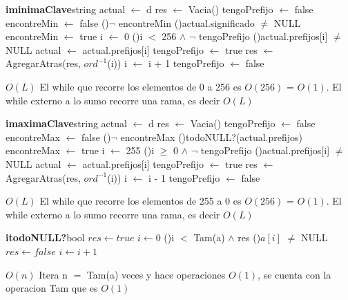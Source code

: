 \begin{Algoritmos}
\begin{algoritmo}{\textbf{iminimaClave}}{}{string}
actual $\gets$ d 
res $\gets$ Vacia() 
tengoPrefijo $\gets$ false 
encontreMin $\gets$ false 
\While(){$\neg$ encontreMin}{
	\eIf(){actual.significado $\neq$ NULL}{
    	encontreMin $\gets$ true 
    }{
    	i $\gets$ 0 
        \While(){i $<$ 256 $\land$ $\neg$ tengoPrefijo}{
			\If(){actual.prefijos[i] $\neq$ NULL}{
            actual $\gets$ actual.prefijos[i] 
            tengoPrefijo $\gets$ true 
            res $\gets$ AgregarAtras(res, $ord^{-1}$(i)) 
            }
            i $\gets$ i + 1 
		}
        tengoPrefijo $\gets$ false 
	}
}    
\end{algoritmo}
\datosAlgoritmo{} %
  {} %
  {} %
  {$O(L)$} %
  {El while que recorre los elementos de 0 a 256 es $O(256)$ = $O(1)$. El while externo a lo sumo recorre una rama, es decir $O(L)$} %

\begin{algoritmo}{\textbf{imaximaClave}}{}{string}
actual $\gets$ d 
res $\gets$ Vacia() 
tengoPrefijo $\gets$ false 
encontreMax $\gets$ false 
\While(){$\neg$ encontreMax}{
	\eIf(){todoNULL?(actual.prefijos)}{
    	encontreMax $\gets$ true 
    }{
    	i $\gets$ 255 
        \While(){i $\geq$ 0 $\land$ $\neg$ tengoPrefijo}{
			\If(){actual.prefijos[i] $\neq$ NULL}{
            actual $\gets$ actual.prefijos[i] 
            tengoPrefijo $\gets$ true 
            res $\gets$ AgregarAtras(res, $ord^{-1}$(i)) 
            }
            i $\gets$ i - 1 
		}
        tengoPrefijo $\gets$ false 
	}
}      	
\end{algoritmo}
\datosAlgoritmo{} %
  {} %
  {} %
  {$O(L)$} %
  {El while que recorre los elementos de 255 a 0 es $O(256)$ = $O(1)$. El while externo a lo sumo recorre una rama, es decir $O(L)$} %

\begin{algoritmo}{\textbf{itodoNULL?}}{}{bool}
	$res \gets true $ 
    $i \gets 0 $ 
	\While(){i $<$ Tam(a) $\land$ res}{
    	  \If(){$a[i]$ $\neq$ NULL}{
      			 $res \gets false $ 
  		}
        $i \gets i + 1$ 
     }   
\end{algoritmo}
\datosAlgoritmo{} %
  {} %
  {} %
  {$O(n)$} %
  {Itera n $=$ Tam(a) veces y hace operaciones $O(1)$, se cuenta con la operacion Tam que es $O(1)$} %
  

\end{Algoritmos}
